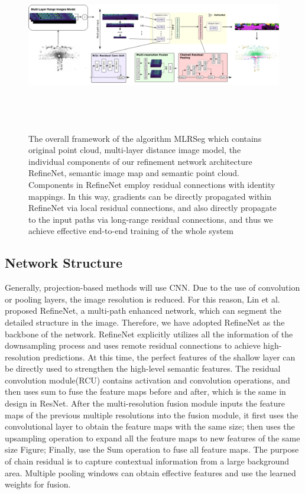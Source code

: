 \documentclass[final]{cvpr}
\begin{document}
\begin{figure}[pt]
\centering
\includegraphics[width=1\linewidth,height=3in]{latex/framwork.png}
\caption{The overall framework of the algorithm MLRSeg which contains original point cloud, multi-layer distance image model, the individual components of our refinement network architecture RefineNet, semantic image map and semantic point cloud. Components in RefineNet employ residual connections with identity mappings. In this way, gradients can be directly propagated within RefineNet via local residual connections, and also directly propagate to the input paths via long-range residual connections, and thus we achieve effective end-to-end training of the whole system}
\label{fig:framework}
\end{figure}

\subsection{Network Structure}
Generally, projection-based methods will use CNN. Due to the use of convolution or pooling layers, the image resolution is reduced. For this reason, Lin et al. proposed RefineNet\cite{12}, a multi-path enhanced network, which can segment the detailed structure in the image. Therefore, we have adopted RefineNet as the backbone of the network. RefineNet explicitly utilizes all the information of the downsampling process and uses remote residual connections to achieve high-resolution predictions.  At this time, the perfect features of the shallow layer can be directly used to strengthen the high-level semantic features.
The residual convolution module(RCU) contains activation and convolution operations, and then uses sum to fuse the feature maps before and after, which is the same in design in ResNet\cite{2016Deep}.  After the multi-resolution fusion module inputs the feature maps of the previous multiple resolutions into the fusion module, it first uses the convolutional layer to obtain the feature maps with the same size; then uses the upsampling operation to expand all the feature maps to new features of the same size  Figure; Finally, use the Sum operation to fuse all feature maps.  The purpose of chain residual is to capture contextual information from a large background area. Multiple pooling windows can obtain effective features and use the learned weights for fusion.
\end{document}
